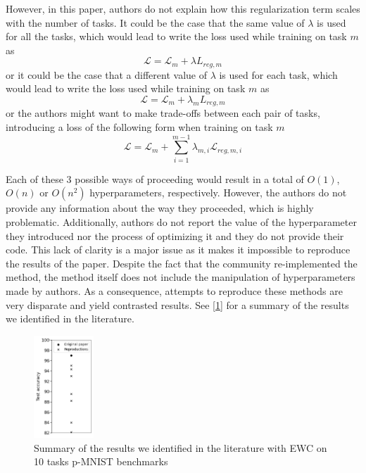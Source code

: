 \documentclass[11pt]{article}
\begin{document}
\vspace{2mm}
\noindent
However, in this paper, authors do not explain how this regularization term scales with the number of tasks. It could be the case that the same value of $\lambda$ is used for all the tasks, which would lead to write the loss used while training on task $m$ as 
\begin{equation}
    \mathcal{L} = \mathcal{L}_{m} + \lambda{L}_{reg,m}
\end{equation}
or it could be the case that a different value of $\lambda$ is used for each task, which would lead to write the loss used while training on task $m$ as
\begin{equation}
    \mathcal{L} = \mathcal{L}_{m} + \lambda_{m}{L}_{reg,m}
\end{equation}
or the authors might want to make trade-offs between each pair of tasks, introducing a loss of the following form when training on task $m$
\begin{equation}
    \mathcal{L} = \mathcal{L}_{m} + \sum_{i=1}^{m-1}\lambda_{m,i}\mathcal{L}_{reg,m,i}
\end{equation}

\vspace{2mm}
\noindent
Each of these $3$ possible ways of proceeding would result in a total of $O(1)$, $O(n)$ or $O(n^2)$ hyperparameters, respectively. However, the authors do not provide any information about the way they proceeded, which is highly problematic. Additionally, authors do not report the value of the hyperparameter they introduced nor the process of optimizing it and they do not provide their code. This lack of clarity is a major issue as it makes it impossible to reproduce the results of the paper. Despite the fact that the community re-implemented the method, the method itself does not include the manipulation of hyperparameters made by authors. As a consequence, attempts to reproduce these methods are very disparate and yield contrasted results. See [\ref{fig:EWCs}] for a summary of the results we identified in the literature.

\begin{figure}
    \centering
    \includegraphics[width=0.20\textwidth]{images/EWCs.png}
    \caption{Summary of the results we identified in the literature with EWC on 10 tasks p-MNIST benchmarks \cite{EWC_0}\cite{EWC_1}\cite{EWC_2_measuring_cf}\cite{EWC_3}\cite{EWC_4_ref_romain}\cite{EWC_5}\cite{EWC_6_Adversarial_CL}\cite{EWC_7_frameworks_2}}
    \label{fig:EWCs}
\end{figure}
\end{document}
